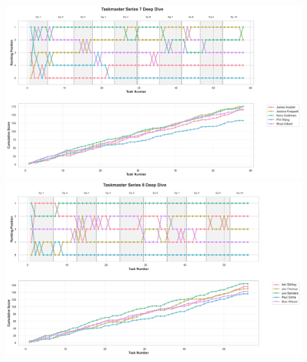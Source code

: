 \documentclass[10pt,letterpaper]{article}
\begin{document}
\begin{figure}[!h]
\centering
\includegraphics[width=\linewidth]{supfigure/series_7_deep_dive.png}
\includegraphics[width=\linewidth]{supfigure/series_8_deep_dive.png}
\end{figure}
\FloatBarrier
\clearpage
\end{document}
